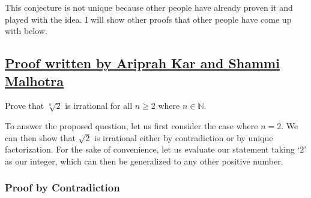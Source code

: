 \documentclass{turabian-researchpaper}
\begin{document}
This conjecture is not unique because other people have already proven it and played with the idea. I will show other proofs that other people have come up with below.  

\subsection{\href{https://mathsociitd.github.io/blog/2021/03/14/irrationality-of-nth-roots/}{Proof written by Ariprah Kar and Shammi Malhotra}}\cite{iit2021}   

Prove that \(\sqrt[n]{2}\) is irrational for all \(n \geq 2\) where \(n \in \mathds{N}\). 

To answer the proposed question, let us first consider the case where \(n = 2\). We can then show that \(\sqrt{2}\) is irrational either by contradiction or by unique factorization. For the sake of convenience, let us evaluate our statement taking ‘\(2\)’ as our integer, which can then be generalized to any other positive number.

\subsubsection{Proof by Contradiction} 
\end{document}
